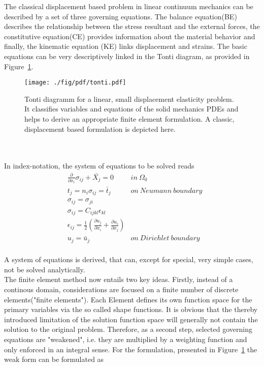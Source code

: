 The classical displacement based problem in linear continuum mechanics can be described by a set of three governing equations. The balance equation(BE) describes the relationship between the stress resultant and the external forces, the constitutive equation(CE) provides information about the material behavior and finally, the kinematic equation (KE) links displacement and strains.
The basic equations can be very descriptively linked in the Tonti diagram\cite{Tonti2013}, as provided in Figure~\ref{fig:tonti}.\\
\begin{figure}[h]
  \centering
  \texttt{[image: ./fig/pdf/tonti.pdf]}
  \caption[Tonti diagram linear]{Tonti diagramm for a linear, small displacement elasticity problem. It classifies variables and equations of the solid mechanics PDEs and helps to derive an appropriate finite element formulation. A classic, displacement based formulation is depicted here.}\label{fig:tonti}
\end{figure} \\
\\
In index-notation, the system of equations to be solved reads
\begin{align}
    & \frac{\partial}{\partial x_i} \sigma_{ij} + \bar{X_j}=0 & in~\Omega_0           \\
    & t_j=n_i \sigma_{ij} = \bar{t}_j                         & on~Neumann~ boundary  \\
  &\sigma_{ij}=\sigma_{ji}\\
  &\sigma_{ij}=C_{ijkl} \epsilon_{kl}\\
  &\epsilon_{ij}=\frac{1}{2} (\frac{\partial u_j}{\partial x_i}+\frac{\partial u_i}{\partial x_j}) \\
    & u_j = \bar{u}_j                                         & on~Dirichlet~boundary 
\end{align}
\\
A system of equations is derived, that can, except for special, very simple cases, not be solved analytically.\\
The finite element method now entails two key ideas. Firstly, instead of a continous domain, considerations are focused on a finite number of discrete elements("finite elements"). Each Element defines its own function space for the primary variables via the so called shape functions. It is obvious that the thereby introduced limitation of the solution function space will generally not contain the solution to the original problem.  Therefore, as a second step, selected governing equations are "weakened", i.e. they are multiplied by a weighting function and only enforced in an integral sense. For the formulation, presented in Figure~\ref{fig:tonti} the weak form can be formulated as

